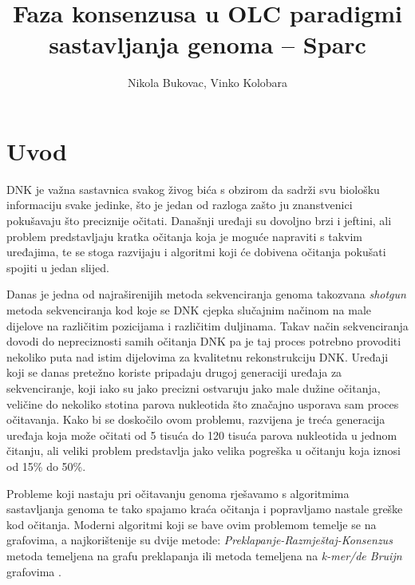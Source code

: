 \documentclass[times, utf8, seminar, numeric]{fer}
\begin{document}
\title{Faza konsenzusa u OLC paradigmi sastavljanja genoma – Sparc}

\author{Nikola Bukovac, Vinko Kolobara}


\maketitle

\tableofcontents

\chapter{Uvod}
DNK je važna sastavnica svakog živog bića s obzirom da sadrži svu biološku informaciju svake jedinke, što je jedan od razloga zašto ju znanstvenici pokušavaju što preciznije očitati. Današnji uređaji su dovoljno brzi i jeftini, ali problem predstavljaju kratka očitanja koja je moguće napraviti s takvim uređajima, te se stoga razvijaju i algoritmi koji će dobivena očitanja pokušati spojiti u jedan slijed.

Danas je jedna od najraširenijih metoda sekvenciranja genoma takozvana \emph{shotgun} \cite[Poglavlje~1.2.2]{sikic2013bioinformatika} metoda sekvenciranja kod koje se DNK cjepka slučajnim načinom na male dijelove na različitim pozicijama i različitim duljinama. Takav način sekvenciranja dovodi do nepreciznosti samih očitanja DNK pa je taj proces potrebno provoditi nekoliko puta nad istim dijelovima za kvalitetnu rekonstrukciju DNK. Uređaji koji se danas pretežno koriste pripadaju drugoj generaciji uređaja za sekvenciranje, koji iako su jako precizni ostvaruju jako male dužine očitanja, veličine do nekoliko stotina parova nukleotida što značajno usporava sam proces očitavanja. Kako bi se doskočilo ovom problemu, razvijena je treća generacija uređaja koja može očitati od 5 tisuća do 120 tisuća parova nukleotida u jednom čitanju, ali veliki problem predstavlja jako velika pogreška u očitanju koja iznosi od 15\% do 50\%.

Probleme koji nastaju pri očitavanju genoma rješavamo s algoritmima sastavljanja genoma te tako spajamo kraća očitanja i popravljamo nastale greške kod očitanja. Moderni algoritmi koji se bave ovim problemom temelje se na grafovima, a najkorištenije su dvije metode: \emph{Preklapanje-Razmještaj-Konsenzus} metoda temeljena na grafu preklapanja ili metoda temeljena na \emph{k-mer/de Bruijn} grafovima \cite{sikic2013bioinformatika}.
\end{document}
